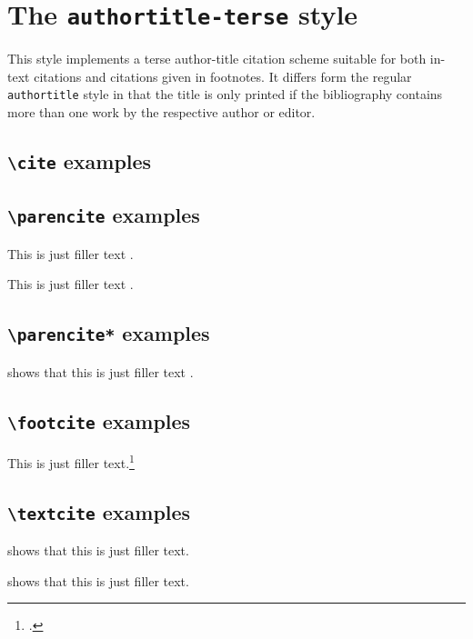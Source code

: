 \documentclass[a4paper]{article}
\newcommand{\cmd}[1]{\texttt{\textbackslash #1}}
\begin{document}
\section*{The \texttt{authortitle-terse} style}

This style implements a terse author-title citation scheme suitable
for both in-text citations and citations given in footnotes. It
differs form the regular \texttt{authortitle} style in that the
title is only printed if the bibliography contains more than one
work by the respective author or editor.

\subsection*{\cmd{cite} examples}

\cite{averroes/bland}

\cite{aristotle:physics}

\cite{aristotle:rhetoric}

\subsection*{\cmd{parencite} examples}

This is just filler text \parencite{averroes/bland}.

This is just filler text \parencite{aristotle:rhetoric}.

\subsection*{\cmd{parencite*} examples}

\citeauthor{aristotle:rhetoric} shows that this is just filler
text \parencite*{aristotle:rhetoric}.

\subsection*{\cmd{footcite} examples}

This is just filler text.\footcite{aristotle:rhetoric}

\subsection*{\cmd{textcite} examples}

\textcite{aristotle:rhetoric} shows that this is just filler text.

\textcite[59]{aristotle:rhetoric} shows that this is just filler text.
\end{document}
